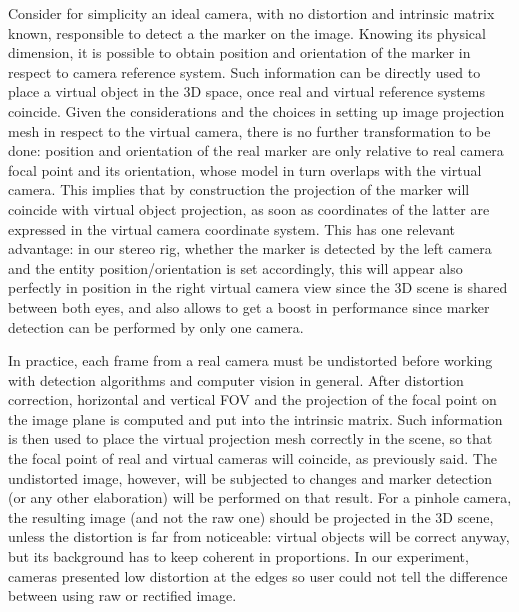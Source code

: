 Consider for simplicity an ideal camera, with no distortion and intrinsic matrix known, responsible to detect a the marker on the image. Knowing its physical dimension, it is possible to obtain position and orientation of the marker in respect to camera reference system. Such information can be directly used to place a virtual object in the 3D space, once real and virtual reference systems coincide. Given the considerations and the choices in setting up image projection mesh in respect to the virtual camera, there is no further transformation to be done: position and orientation of the real marker are only relative to real camera focal point and its orientation, whose model in turn overlaps with the virtual camera. This implies that by construction the projection of the marker will coincide with virtual object projection, as soon as coordinates of the latter are expressed in the virtual camera coordinate system. This has one relevant advantage: in our stereo rig, whether the marker is detected by the left camera and the entity position/orientation is set accordingly, this will appear also perfectly in position in the right virtual camera view since the 3D scene is shared between both eyes, and also allows to get a boost in performance since marker detection can be performed by only one camera.

In practice, each frame from a real camera must be undistorted before working with detection algorithms and computer vision in general. After distortion correction, horizontal and vertical FOV and the projection of the focal point on the image plane is computed and put into the intrinsic matrix. Such information is then used to place the virtual projection mesh correctly in the scene, so that the focal point of real and virtual cameras will coincide, as previously said. The undistorted image, however, will be subjected to changes and marker detection (or any other elaboration) will be performed on that result. For a pinhole camera, the resulting image (and not the raw one) should be projected in the 3D scene, unless the distortion is far from noticeable: virtual objects will be correct anyway, but its background has to keep coherent in proportions. In our experiment, cameras presented low distortion at the edges so user could not tell the difference between using raw or rectified image.

